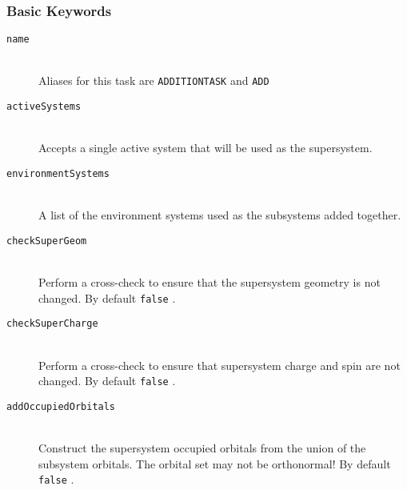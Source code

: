 \documentclass[bibliography=totocnumbered,a4paper,10pt,oneside]{scrbook}
\newcommand{\ttt}[1]{%
  \begingroup\setlength{\fboxsep}{1pt}%
  \colorbox{serenity-green!30}{\texttt{\hspace*{2pt}\vphantom{(g}#1\hspace*{2pt}}}%
  \endgroup
}
\begin{document}
\subsubsection{Basic Keywords}
\begin{description}
	\item[\texttt{name}]\hfill \\
	Aliases for this task are \ttt{ADDITIONTASK} and \ttt{ADD}
	\item[\texttt{activeSystems}]\hfill \\
	Accepts a single active system that will be used as the supersystem.
	\item[\texttt{environmentSystems}]\hfill \\
	A list of the environment systems used as the subsystems added together.
	\item[\texttt{checkSuperGeom}]\hfill \\
	Perform a cross-check to ensure that the supersystem geometry is not changed. By default \ttt{false}.
	\item[\texttt{checkSuperCharge}]\hfill \\
	Perform a cross-check to ensure that supersystem charge and spin are not changed. By default \ttt{false}.
	\item[\texttt{addOccupiedOrbitals}]\hfill \\
	Construct the supersystem occupied orbitals from the union of the subsystem orbitals. The orbital set may not be orthonormal! By default \ttt{false}.
\end{description}
\end{document}
